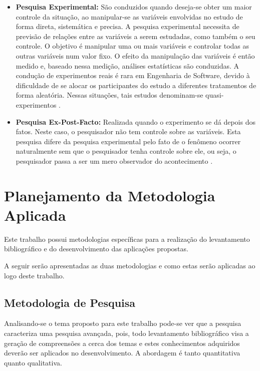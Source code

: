 \begin{itemize}
\begin{itemize}
			\item \textbf{Pesquisa Experimental:} São conduzidos quando deseja-se obter um maior controle da situação, ao manipular-se as variáveis envolvidas no estudo de forma direta, sistemática e precisa. A pesquisa experimental necessita de previsão de relações entre as variáveis a serem estudadas, como também o seu controle. O objetivo é manipular uma ou mais variáveis e controlar todas as outras variáveis num valor fixo. O efeito da manipulação das variáveis é então medido e, baseado nessa medição, análises estatísticas são conduzidas. A condução de experimentos reais é rara em Engenharia de Software, devido à dificuldade de se alocar os participantes do estudo a diferentes tratamentos de forma aleatória. Nessas situações, tais estudos denominam-se quasi-experimentos \cite{Mafra:Travassos:2006}.
			
			\item \textbf{Pesquisa Ex-Post-Facto:} Realizada quando o experimento se dá depois dos fatos. Neste caso, o pesquisador não tem controle sobre as variáveis. Esta pesquisa difere da pesquisa experimental pelo fato de o fenômeno ocorrer naturalmente sem que o pesquisador tenha controle sobre ele, ou seja, o pesquisador passa a ser um mero observador do acontecimento \cite{Silva:Tafner:2007}.
		\end{itemize}

\end{itemize}

\section{Planejamento da Metodologia Aplicada}

Este trabalho possui metodologias específicas para a realização do levantamento bibliográfico e do desenvolvimento das aplicações propostas.

A seguir serão apresentadas as duas metodologias e como estas serão aplicadas ao logo deste trabalho.

\subsection{Metodologia de Pesquisa}

Analisando-se o tema proposto para este trabalho pode-se ver que a pesquisa caracteriza uma pesquisa avançada, pois, todo levantamento bibliográfico visa a geração de compreensões a cerca dos temas e estes conhecimentos adquiridos deverão ser aplicados no desenvolvimento. A abordagem é tanto quantitativa quanto qualitativa.

